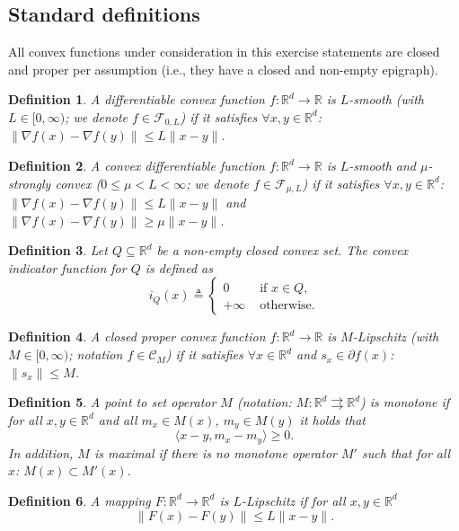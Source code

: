 \documentclass[11pt,a4paper]{article}
\newcommand{\inner}[2]{{\langle #1, #2\rangle}}
\newtheorem{definition}{Definition}
\begin{document}
	\subsection{Standard definitions}
	All convex functions under consideration in this exercise statements are closed and proper per assumption (i.e., they have a closed and non-empty epigraph).
	\begin{definition}\label{def:smoothconvex}
	A differentiable convex function $f:\mathbb{R}^d\rightarrow \mathbb{R}$ is $L$-smooth (with $L\in [0,\infty)$; we denote $f\in\mathcal{F}_{0,L}$) if it satisfies $\forall x,y\in\mathbb{R}^d$: $\|\nabla f(x)-\nabla f(y)\|\leqslant L \|x-y\|$.
	\end{definition}
	\begin{definition}\label{def:smoothstronglyconvex}
	A convex differentiable function $f:\mathbb{R}^d\rightarrow \mathbb{R}$ is $L$-smooth and $\mu$-strongly convex ($0\leqslant \mu<L<\infty$; we denote $f\in\mathcal{F}_{\mu,L}$) if it satisfies $\forall x,y\in\mathbb{R}^d$: $\|\nabla f(x)-\nabla f(y)\|\leqslant L \|x-y\|$ and $\|\nabla f(x)-\nabla f(y)\|\geqslant \mu \|x-y\|$.
	\end{definition}
	\begin{definition}\label{def:indicator}
	Let $Q\subseteq \mathbb{R}^d$ be a non-empty closed convex set. The convex indicator function for $Q$ is defined as 
	\[ i_Q(x) \triangleq \left\{\begin{array}{ll}0 &\text{ if }x\in Q,\\+\infty &\text{ otherwise.}\end{array}\right. \]
	\end{definition}
	\begin{definition}\label{def:Lipschtzfunc}
	A closed proper convex function $f:\mathbb{R}^d\rightarrow \mathbb{R}$ is $M$-Lipschitz (with $M\in [0,\infty)$; notation $f\in\mathcal{C}_M$) if it satisfies $\forall x\in\mathbb{R}^d$ and $s_x\in\partial f(x)$: $\|s_x\|\leqslant M$.
	\end{definition}
	\begin{definition}\label{def:monotone}
	A point to set operator $M$ (notation: $M:\mathbb{R}^d\rightrightarrows\mathbb{R}^d$) is monotone if for all $x,y\in\mathbb{R}^d$ and all $m_x\in M(x)$, $m_y\in M(y)$ it holds that
	\[ \inner{ x-y}{m_x-m_y}\geqslant 0.\]
In addition, $M$ is maximal if there is no monotone operator $M'$ such that for all $x$: $M(x)\subset M'(x)$.
	\end{definition}
	\begin{definition}\label{def:Lipschitz}
	A mapping $F:\mathbb{R}^d\rightarrow\mathbb{R}^d$ is $L$-Lipschitz if for all $x,y\in\mathbb{R}^d$ 
	\[ \|F(x)-F(y)\|\leqslant L\|x-y\|.\]
	\end{definition}
	
\end{document}
